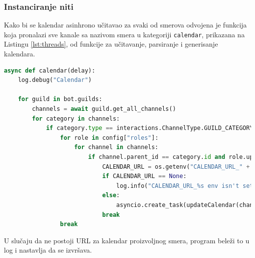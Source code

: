 \documentclass[a4paper,11pt]{article}
\begin{document}
\subsubsection{Instanciranje niti}
Kako bi se kalendar asinhrono učitavao za svaki od smerova odvojena je funkcija koja pronalazi sve kanale sa nazivom smera u kategoriji \texttt{calendar}, prikazana na Listingu \ref{lst:threads}, od funkcije za učitavanje, parsiranje i generisanje kalendara.
\begin{lstlisting}[language=Python, caption=Instanciranje niti, label=lst:threads]
async def calendar(delay):
    log.debug("Calendar")

    for guild in bot.guilds:
        channels = await guild.get_all_channels()
        for category in channels:
            if category.type == interactions.ChannelType.GUILD_CATEGORY and category.name.upper() == "calendar":
                for role in config["roles"]:
                    for channel in channels:
                        if channel.parent_id == category.id and role.upper() == channel.name.upper():
                            CALENDAR_URL = os.getenv("CALENDAR_URL_" + role)
                            if CALENDAR_URL == None:
                                log.info("CALENDAR_URL_%s env isn't set, skipping."%(role))
                            else:
                                asyncio.create_task(updateCalendar(channel, CALENDAR_URL, delay))
                            break
                break
\end{lstlisting}
U slučaju da ne postoji URL za kalendar proizvoljnog smera, program beleži to u log i nastavlja da se izvršava.
\newpage
\end{document}
